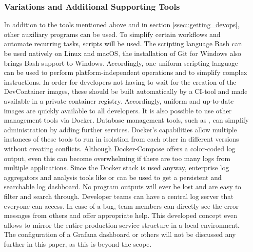         \subsubsection{Variations and Additional Supporting Tools}
        In addition to the tools mentioned above and in section \ref{ssec::getting_devops}, other auxiliary programs can be used. To simplify certain workflows and automate recurring tasks, scripts will be used. The scripting language Bash can be used natively on Linux and macOS, the installation of Git for Windows also brings Bash support to Windows. Accordingly, one uniform scripting language can be used to perform platform-independent operations and to simplify complex instructions. In order for developers not having to wait for the creation of the DevContainer images, these should be built automatically by a \ac{CI}-tool and made available in a private container registry. Accordingly, uniform and up-to-date images are quickly available to all developers. \newline
        It is also possible to use other management tools via Docker. Database management tools, such as , can simplify administration by adding further services. Docker's capabilities allow multiple instances of these tools to run in isolation from each other in different versions without creating conflicts. Although Docker-Compose offers a color-coded log output, even this can become overwhelming if there are too many logs from multiple applications. Since the Docker stack is used anyway, enterprise log aggregators and analysis tools like  or  can be used to get a persistent and searchable log dashboard. No program outputs will ever be lost and are easy to filter and search through. Developer teams can have a central log server that everyone can access. In case of a bug, team members can directly see the error messages from others and offer appropriate help. This developed concept even allows to mirror the entire production service structure in a local environment. The configuration of a Grafana dashboard or others will not be discussed any further in this paper, as this is beyond the scope.

